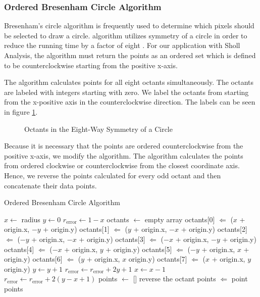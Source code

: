 \documentclass{sig-alternate}
\begin{document}
	\subsubsection{Ordered Bresenham Circle Algorithm} %
	\label{ssub:Ordered Bresenham Circle Algorithm}
		Bresenham's circle algorithm is frequently used to determine which
		pixels should be selected to draw a circle. algorithm utilizes
		symmetry of a circle in order to reduce the running time by a
		factor of eight \cite{bresenham77}. For our application with Sholl
		Analysis, the algorithm must return the points as an ordered set
		which is defined to be counterclockwise starting from the positive
		x-axis.

		The algorithm calculates points for all eight octants simultaneously.
		The octants are labeled with integers starting with zero. We label the
		octants from starting from the x-positive axis in the counterclockwise
		direction. The labels can be seen in figure \ref{fig:eightsymmetry}.
		\begin{figure}[htp]
			\centering
			
			\caption{Octants in the Eight-Way Symmetry of a Circle}
			\label{fig:eightsymmetry}
		\end{figure}
		Because it is necessary that the points are ordered
		counterclockwise from the positive x-axis, we modify the
		algorithm. The algorithm calculates the points from ordered
		clockwise or counterclockwise from the closest coordinate axis.
		Hence, we reverse the points calculated for every odd octant and
		then concatenate their data points.

		\begin{algorithm}[ht!]
			\caption{Ordered Bresenham Circle Algorithm}
			\begin{algorithmic}
					\State $x \gets$ radius
					\State $y \gets 0$
					\State $r_{\text{error}} \gets 1 - x$
					\State octants $\gets$ empty array
						\State octants[0] $\Leftarrow$ ($x$ + origin.x, $-y$ + origin.y)
						\State octants[1] $\Leftarrow$ ($y$ + origin.x, $-x$ + origin.y)
						\State octants[2] $\Leftarrow$ ($-y$ + origin.x, $-x$ + origin.y)
						\State octants[3] $\Leftarrow$ ($-x$ + origin.x, $-y$ + origin.y)
						\State octants[4] $\Leftarrow$ ($-x$ + origin.x, $y$ + origin.y)
						\State octants[5] $\Leftarrow$ ($-y$ + origin.x, $x$ + origin.y)
						\State octants[6] $\Leftarrow$ ($y$ + origin.x, $x$ origin.y)
						\State octants[7] $\Leftarrow$ ($x$ + origin.x, $y$ origin.y)
						\State $y \gets y + 1$
							\State $r_{\text{error}} \gets r_{\text{error}} + 2y + 1$
						\Else
							\State $x \gets x - 1$
							\State $r_{\text{error}} \gets r_{\text{error}} + 2(y - x + 1)$
						\EndIf
					\EndWhile
					\State points $\gets$ []
							\State reverse the octant
						\EndIf
							\State points $\Leftarrow$ point
						\EndFor
					\EndFor
					\State \Return points
				\EndProcedure
			\end{algorithmic}
		\end{algorithm}

\end{document}
